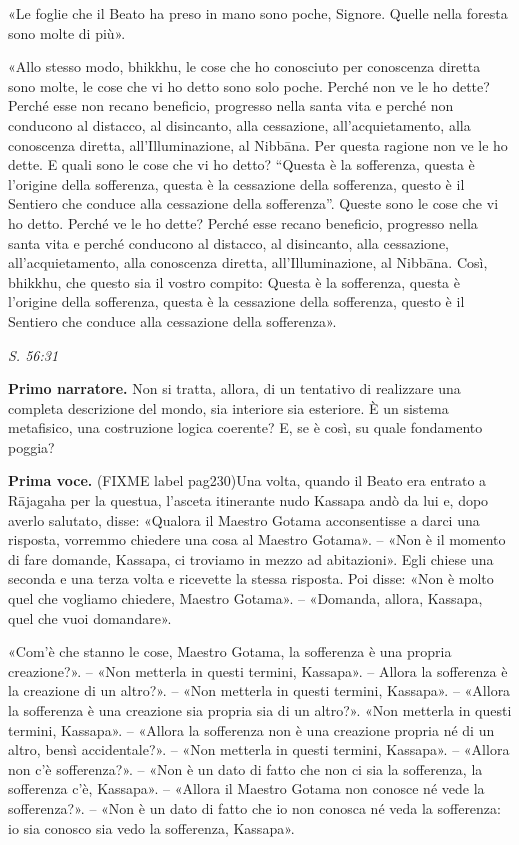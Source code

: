 «Le foglie che il Beato ha preso in mano sono poche, Signore. Quelle
nella foresta sono molte di più».


«Allo stesso modo, bhikkhu, le cose che ho conosciuto per conoscenza
diretta sono molte, le cose che vi ho detto sono solo poche. Perché non
ve le ho dette? Perché esse non recano beneficio, progresso nella santa
vita e perché non conducono al distacco, al disincanto, alla cessazione,
all’acquietamento, alla conoscenza diretta, all’Illuminazione, al
Nibbāna. Per questa ragione non ve le ho dette. E quali sono le cose che
vi ho detto? “Questa è la sofferenza, questa è l’origine della
sofferenza, questa è la cessazione della sofferenza, questo è il
Sentiero che conduce alla cessazione della sofferenza”. Queste sono le
cose che vi ho detto. Perché ve le ho dette? Perché esse recano
beneficio, progresso nella santa vita e perché conducono al distacco, al
disincanto, alla cessazione, all’acquietamento, alla conoscenza diretta,
all’Illuminazione, al Nibbāna. Così, bhikkhu, che questo sia il vostro
compito: Questa è la sofferenza, questa è l’origine della sofferenza,
questa è la cessazione della sofferenza, questo è il Sentiero che
conduce alla cessazione della sofferenza».


\emph{S. 56:31}


\textbf{Primo narratore.} Non si tratta, allora, di un tentativo di realizzare
una completa descrizione del mondo, sia interiore sia esteriore. È un
sistema metafisico, una costruzione logica coerente? E, se è così, su
quale fondamento poggia?


\textbf{Prima voce.} (FIXME label pag230)Una volta, quando il Beato era entrato a Rājagaha per la
questua, l’asceta itinerante nudo Kassapa andò da lui e, dopo averlo
salutato, disse: «Qualora il Maestro Gotama acconsentisse a darci una
risposta, vorremmo chiedere una cosa al Maestro Gotama». – «Non è il
momento di fare domande, Kassapa, ci troviamo in mezzo ad abitazioni».
Egli chiese una seconda e una terza volta e ricevette la stessa
risposta. Poi disse: «Non è molto quel che vogliamo chiedere, Maestro
Gotama». – «Domanda, allora, Kassapa, quel che vuoi domandare».


«Com’è che stanno le cose, Maestro Gotama, la sofferenza è una propria
creazione?». – «Non metterla in questi termini, Kassapa». – Allora la
sofferenza è la creazione di un altro?». – «Non metterla in questi
termini, Kassapa». – «Allora la sofferenza è una creazione sia propria
sia di un altro?». «Non metterla in questi termini, Kassapa». – «Allora
la sofferenza non è una creazione propria né di un altro, bensì
accidentale?». – «Non metterla in questi termini, Kassapa». – «Allora
non c’è sofferenza?». – «Non è un dato di fatto che non ci sia la
sofferenza, la sofferenza c’è, Kassapa». – «Allora il Maestro Gotama non
conosce né vede la sofferenza?». – «Non è un dato di fatto che io non
conosca né veda la sofferenza: io sia conosco sia vedo la sofferenza,
Kassapa».


